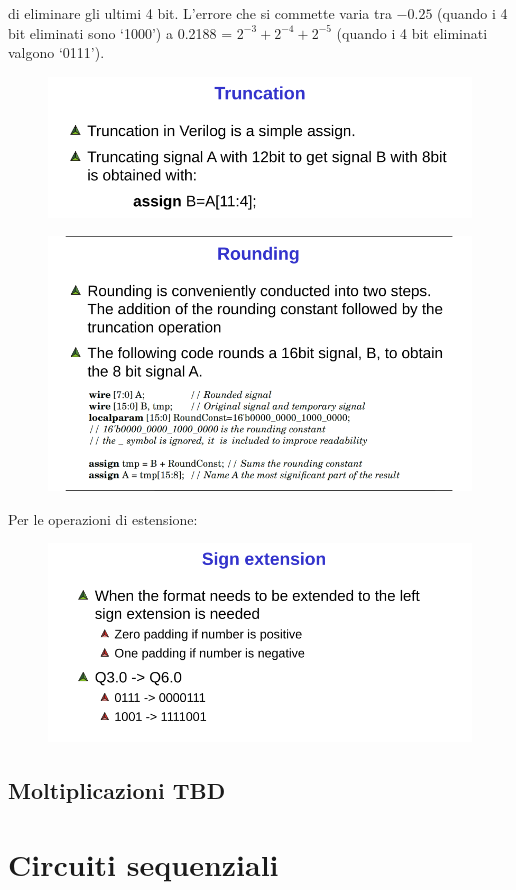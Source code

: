 \documentclass{book}
\begin{document}
        di eliminare gli ultimi 4 bit. L’errore che si commette varia tra $-0.25$ (quando i 4 bit eliminati sono ‘1000’) a 0.2188 = $2^{-3} +2^{-4} +2^{-5}$ (quando i 4 bit eliminati valgono ‘0111’).
        \begin{figure}[h!]
            \centering
            \includegraphics[width=0.65\linewidth]{img/chapt10img7.png}
        \end{figure}
        \begin{figure}[h!]
            \centering
            \includegraphics[width=0.65\linewidth]{img/chapt10img8.png}
        \end{figure}
        Per le operazioni di estensione:
        \begin{figure}[h!]
            \centering
            \includegraphics[width=0.5\linewidth]{img/chapt10img9.png}
        \end{figure}
        
    \section{Moltiplicazioni TBD}

\chapter{Circuiti sequenziali}
\end{document}
